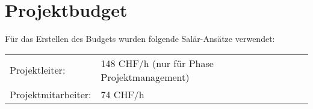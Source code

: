 \section{Projektbudget}
Für das Erstellen des Budgets wurden folgende Salär-Ansätze verwendet: 
\begin{table}[H]
\begin{tabular}{ll}
Projektleiter:      & 148 CHF/h (nur für Phase Projektmanagement) \\
Projektmitarbeiter: & 74 CHF/h                                   
\end{tabular}
\end{table}

